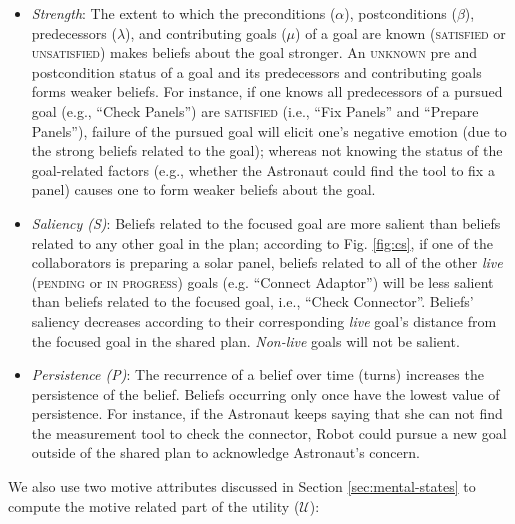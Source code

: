 \begin{itemize}[leftmargin=2pt]
  \setlength\itemsep{1mm}
  \item \textit{Strength}: The extent to which the preconditions ($\alpha$),
  postconditions ($\beta$), predecessors ($\lambda$), and contributing goals
  ($\mu$) of a goal are known (\textsc{satisfied} or \textsc{unsatisfied}) makes
  beliefs about the goal stronger. An \textsc{unknown} pre and postcondition
  status of a goal and its predecessors and contributing goals forms weaker
  beliefs. For instance, if one knows all predecessors of a pursued goal (e.g.,
  ``Check Panels'') are \textsc{satisfied} (i.e., ``Fix Panels'' and ``Prepare
  Panels''), failure of the pursued goal will elicit one's negative emotion (due
  to the strong beliefs related to the goal); whereas not knowing the status of
  the goal-related factors (e.g., whether the Astronaut could find the tool to
  fix a panel) causes one to form weaker beliefs about the goal.
  \item \textit{Saliency (S)}: Beliefs related to the focused goal are more
  salient than beliefs related to any other goal in the plan; according to
  Fig. \ref{fig:cs}, if one of the collaborators is preparing a solar panel,
  beliefs related to all of the other \textit{live} (\textsc{pending} or
  \textsc{in progress}) goals (e.g. ``Connect Adaptor'') will be less salient
  than beliefs related to the focused goal, i.e., ``Check Connector''. Beliefs'
  saliency decreases according to their corresponding \textit{live} goal's
  distance from the focused goal in the shared plan. \textit{Non-live} goals
  will not be salient.
  \item \textit{Persistence (P)}: The recurrence of a belief over time (turns)
  increases the persistence of the belief. Beliefs occurring only once have the
  lowest value of persistence. For instance, if the Astronaut keeps saying that
  she can not find the measurement tool to check the connector, Robot could  
  pursue a new goal outside of the shared plan to acknowledge Astronaut's
  concern.
\end{itemize}

\noindent We also use two motive attributes discussed in Section
\ref{sec:mental-states} to compute the motive related part of the utility
($\mathcal{U}$):

